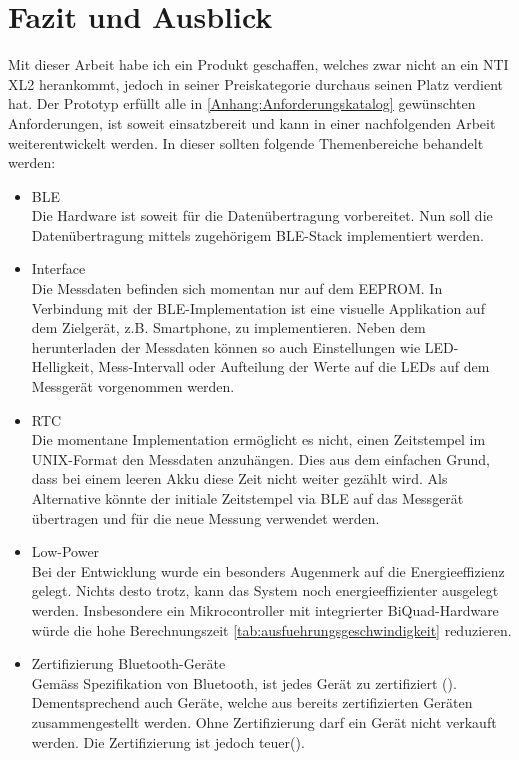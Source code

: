 \documentclass[12pt]{article}
\begin{document}
	\newpage
	\section{Fazit und Ausblick}
	Mit dieser Arbeit habe ich ein Produkt geschaffen, welches zwar nicht an ein NTI XL2 herankommt, jedoch in seiner Preiskategorie durchaus seinen Platz verdient hat. Der Prototyp erfüllt alle in \ref{Anhang:Anforderungskatalog} gewünschten Anforderungen, ist soweit einsatzbereit und kann in einer nachfolgenden Arbeit weiterentwickelt werden. In dieser sollten folgende Themenbereiche behandelt werden:
	\begin{itemize}
		\item BLE \\
		Die Hardware ist soweit für die Datenübertragung vorbereitet. Nun soll die Datenübertragung mittels zugehörigem BLE-Stack implementiert werden.
		\item Interface \\
		Die Messdaten befinden sich momentan nur auf dem EEPROM. In Verbindung mit der BLE-Implementation ist eine visuelle Applikation auf dem Zielgerät, z.B. Smartphone, zu implementieren. Neben dem herunterladen der Messdaten können so auch Einstellungen wie LED-Helligkeit, Mess-Intervall oder Aufteilung der Werte auf die LEDs auf dem Messgerät vorgenommen werden.
		\item RTC \\
		Die momentane Implementation ermöglicht es nicht, einen Zeitstempel im UNIX-Format den Messdaten anzuhängen. Dies aus dem einfachen Grund, dass bei einem leeren Akku diese Zeit nicht weiter gezählt wird. Als Alternative könnte der initiale Zeitstempel via BLE auf das Messgerät übertragen und für die neue Messung verwendet werden.
		\item Low-Power \\
		Bei der Entwicklung wurde ein besonders Augenmerk auf die Energieeffizienz gelegt. Nichts desto trotz, kann das System noch energieeffizienter ausgelegt werden. Insbesondere ein Mikrocontroller mit integrierter BiQuad-Hardware würde die hohe Berechnungszeit \ref{tab:ausfuehrungsgeschwindigkeit} reduzieren.
		\item Zertifizierung Bluetooth-Geräte\\
		Gemäss Spezifikation von Bluetooth, ist jedes Gerät zu zertifiziert (\cite{noauthor_bluetooth_nodate-1}). Dementsprechend auch Geräte, welche aus bereits zertifizierten Geräten zusammengestellt werden. Ohne Zertifizierung darf ein Gerät nicht verkauft werden. Die Zertifizierung ist jedoch teuer(\cite{noauthor_bluetooth_nodate}).
	\end{itemize}
	
\end{document}
